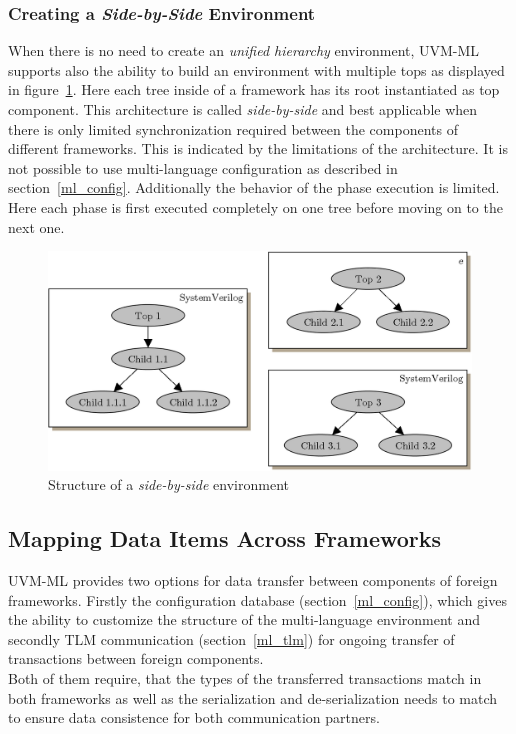 \subsubsection{Creating a \emph{Side-by-Side} Environment}

When there is no need to create an \emph{unified hierarchy} environment, UVM-ML supports also the ability to build an
environment with multiple tops as displayed in figure~\ref{fig:UVM_ML_side_by_side}. Here each tree inside of a
framework has its root instantiated as top component. This architecture is called \emph{side-by-side} and best
applicable when there is only limited synchronization required between the components of different frameworks. This is
indicated by the limitations of the architecture. It is not possible to use multi-language configuration as described in
section~\ref{ml_config}. Additionally the behavior of the phase execution is limited. Here each phase is first executed
completely on one tree before moving on to the next one. 

\begin{figure}[htb]
 \centering
 \includegraphics[scale=0.3]{abb/UVM_ML_side_by_side}
 \caption{Structure of a \emph{side-by-side} environment}
\label{fig:UVM_ML_side_by_side}
\end{figure}

\subsection{Mapping Data Items Across Frameworks }\label{type_mapping}
UVM-ML provides two options for data transfer between components of foreign frameworks. Firstly the configuration
database (section~\ref{ml_config}), which gives the ability to customize the structure of the multi-language
environment and secondly TLM communication (section~\ref{ml_tlm}) for ongoing transfer of transactions between foreign components.\\
Both of them require, that the types of the transferred transactions match in both frameworks as well as the
serialization and de-serialization needs to match to ensure data consistence for both communication partners.

